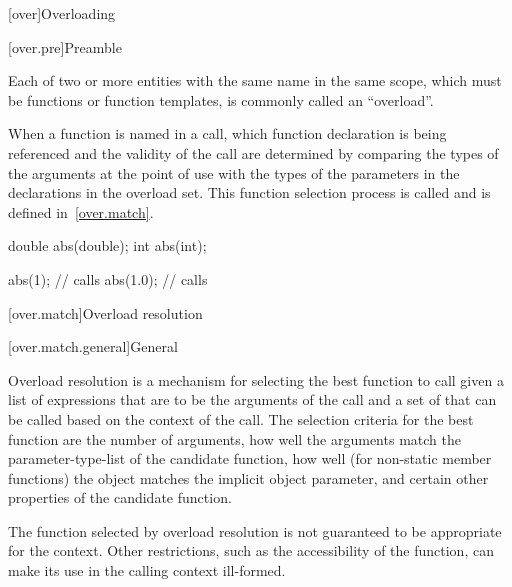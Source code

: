 [over]{Overloading}%


[over.pre]{Preamble}

\pnum
{}%
%
\begin{note}
Each of two or more entities with the same name in the same scope,
which must be functions or function templates,
is commonly called an ``overload''.
\end{note}

\pnum
When a function is named in a call, which function
declaration is being referenced and the validity of the call
are determined by comparing the types
of the arguments at the point of use with the types of the parameters
in the declarations in the overload set.
This function selection process is called
 and is defined in~\ref{over.match}.
\begin{example}
%
\begin{codeblock}
double abs(double);
int abs(int);

abs(1);             // calls 
abs(1.0);           // calls 
\end{codeblock}
\end{example}

[over.match]{Overload resolution}%

[over.match.general]{General}%
%
%

\pnum
Overload resolution is a mechanism for selecting the best
function to call given a list of expressions that are to be the
arguments of the call and a set of
that can
be called based on the context of the call.
The selection
criteria for the best function are the number of arguments, how
well the arguments match the parameter-type-list of the
candidate function,
how well (for non-static member functions) the object
matches the implicit object parameter,
and certain other properties of the candidate function.
\begin{note}
The function selected by overload resolution is not
guaranteed to be appropriate for the context.
Other restrictions,
such as the accessibility of the function, can make its use in
the calling context ill-formed.
\end{note}

